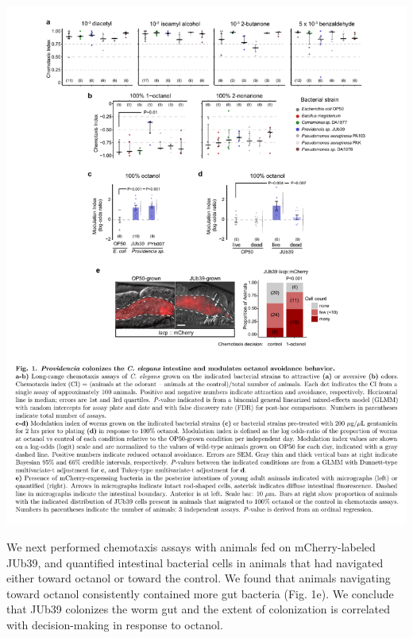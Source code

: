 \documentclass[11pt,]{article}
\begin{document}
\begin{center}\includegraphics[width=1.05\linewidth]{Figure1} \end{center}

We next performed chemotaxis assays with animals fed on mCherry-labeled
JUb39, and quantified intestinal bacterial cells in animals that had
navigated either toward octanol or toward the control. We found that
animals navigating toward octanol consistently contained more gut
bacteria (Fig. 1e). We conclude that JUb39 colonizes the worm gut and
the extent of colonization is correlated with decision-making in
response to octanol.
\end{document}
